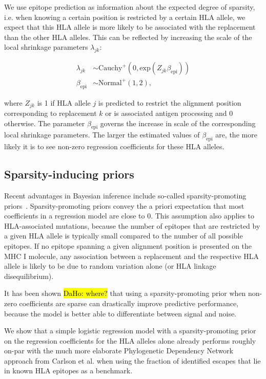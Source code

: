 \documentclass{bioinfo}
\begin{document}
\begin{methods}
We use epitope prediction as information about the expected degree of sparsity, i.e. when knowing a certain position is restricted by a certain HLA allele, we expect that this HLA allele is more likely to be associated with the replacement than the other HLA alleles.
This can be reflected by increasing the scale of the local shrinkage parameters \(\lambda_{jk}\):

\begin{equation}
  \begin{aligned}
    \lambda_{jk} &\sim \text{Cauchy}^{+}(0, \text{exp}(Z_{jk}\beta_{\text{epi}})) \\
    \beta_{\text{epi}} &\sim \text{Normal}^{+}(1, 2),
  \end{aligned}
\end{equation}
 
where \(Z_{jk}\) is 1 if HLA allele \(j\) is predicted to restrict the alignment position corresponding to replacement \(k\) or is associated antigen processing and 0 otherwise.
The parameter \(\beta_{\text{epi}}\) governs the increase in scale of the  corresponding local shrinkage parameters. The larger the estimated values of \(\beta_{\text{epi}}\) are, the more likely it is to see non-zero regression coefficients for these HLA alleles.

\subsection{Sparsity-inducing priors}
  
  Recent advantages in Bayesian inference include so-called sparsity-promoting priors~\citep{Piironen2017}. Sparsity-promoting priors convey the a priori expectation that most coefficients in a regression model are close to 0. This assumption also applies to HLA-associated mutations, because the number of epitopes that are restricted by a given HLA allele is typically small compared to the number of all possible epitopes. If no epitope spanning a given alignment position is presented on the MHC I molecule, any association between a replacement and the respective HLA allele  is likely to be due to random variation alone (or HLA linkage disequilibrium).
  
  It has been shown \hl{DaHo: where?} that using a sparsity-promoting prior when non-zero coefficients are sparse can drastically improve predictive performance, because the model is better able to differentiate between signal and noise.

  We show that a simple logistic regression model with a sparsity-promoting prior on the regression coefficients for the HLA alleles alone already performs roughly on-par  with the much more elaborate Phylogenetic Dependency Network approach from Carlson et al. when using the fraction of identified escapes that lie in known HLA epitopes as a benchmark.


\end{methods}
\end{document}
